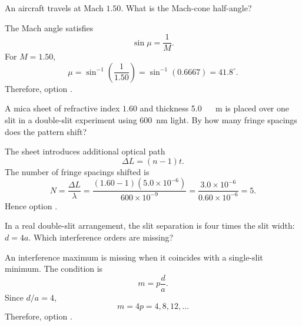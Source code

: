 \begin{quizquestion}[
  id=phy104-wave-035,
  topic=waves-and-sound,
  difficulty=applied,
  marks=2,
  correct=E,
  tags={mach-cone,mach-number,angle},
  outcome={Calculate a Mach-cone half-angle}
]
  An aircraft travels at Mach \(1.50\). What is the Mach-cone half-angle?
\end{quizquestion}
\begin{quizsolution}
  The Mach angle satisfies
    \[
      \sin\mu=\frac{1}{M}.
    \]
    For \(M=1.50\),
    \[
      \mu=\sin^{-1}\left(\frac{1}{1.50}\right)
      =\sin^{-1}(0.6667)
      =41.8^\circ.
    \]
    Therefore, option \textbf{\quizcorrectletter}.
\end{quizsolution}

\begin{quizquestion}[
  id=phy104-opt-036,
  topic=optics,
  difficulty=applied,
  marks=2,
  correct=B,
  tags={double-slit,optical-path,fringe-shift},
  outcome={Calculate the fringe shift caused by a transparent sheet}
]
  A mica sheet of refractive index \(1.60\) and thickness \SI{5.0}{\micro\,m} is placed over one slit in a double-slit experiment using \SI{600}{nm} light. By how many fringe spacings does the pattern shift?
\end{quizquestion}
\begin{quizsolution}
  The sheet introduces additional optical path
    \[
      \Delta L=(n-1)t.
    \]
    The number of fringe spacings shifted is
    \[
      N=\frac{\Delta L}{\lambda}
      =\frac{(1.60-1)(5.0\times10^{-6})}{600\times10^{-9}}
      =\frac{3.0\times10^{-6}}{0.60\times10^{-6}}=5.
    \]
    Hence option \textbf{\quizcorrectletter}.
\end{quizsolution}

\begin{quizquestion}[
  id=phy104-opt-037,
  topic=optics,
  difficulty=applied,
  marks=2,
  correct=C,
  tags={double-slit,diffraction-envelope,missing-orders},
  outcome={Identify missing interference orders in a real double slit}
]
  In a real double-slit arrangement, the slit separation is four times the slit width: \(d=4a\). Which interference orders are missing?
\end{quizquestion}
\begin{quizsolution}
  An interference maximum is missing when it coincides with a single-slit minimum. The condition is
    \[
      m=p\frac{d}{a}.
    \]
    Since \(d/a=4\),
    \[
      m=4p=4,8,12,\ldots
    \]
    Therefore, option \textbf{\quizcorrectletter}.
\end{quizsolution}

